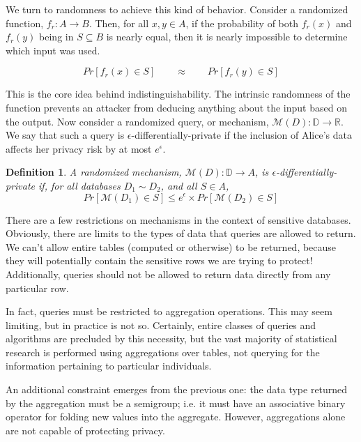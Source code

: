 \documentclass[12pt]{article}
\newtheorem{defn}{Definition}[section]
\begin{document}
We turn to randomness to achieve this kind of behavior.
Consider a randomized function, $f_r : A \rightarrow B$.
Then, for all $x,y \in A$, if the probability of both $f_r(x)$ and $f_r(y)$ being in $S \subseteq B$ is nearly equal, then it is nearly impossible to determine which input was used.

$$ Pr[f_r(x)\in S] \qquad\approx\qquad  Pr[f_r(y)\in S] $$

This is the core idea behind indistinguishability.
The intrinsic randomness of the function prevents an attacker from deducing anything about the input based on the output.
Now consider a randomized query, or mechanism, $\mathcal M(D) : \mathbb D \rightarrow \mathbb R$.
We say that such a query is $\epsilon$-differentially-private if the inclusion of Alice's data affects her privacy risk by at most $e^\epsilon$. %

\begin{defn}\label{def:diffpriv}
  A randomized mechanism, $\mathcal{M}(D) : \mathbb D \rightarrow A$, is $\epsilon$-differentially-private if, for all databases $D_1 \sim D_2$, and all $S \in A$,
  $$Pr[\mathcal M(D_1)\in S] \le e^\epsilon \times Pr[\mathcal M(D_2)\in S]$$
\end{defn}

There are a few restrictions on mechanisms in the context of sensitive databases.
Obviously, there are limits to the types of data that queries are allowed to return.
We can't allow entire tables (computed or otherwise) to be returned, because they will potentially contain the sensitive rows we are trying to protect!
Additionally, queries should not be allowed to return data directly from any particular row.

In fact, queries must be restricted to aggregation operations.
This may seem limiting, but in practice is not so.
Certainly, entire classes of queries and algorithms are precluded by this necessity, but the vast majority of statistical research is performed using aggregations over tables, not querying for the information pertaining to particular individuals.

An additional constraint emerges from the previous one: the data type returned by the aggregation must be a semigroup; i.e. it must have an associative binary operator for folding new values into the aggregate.
However, aggregations alone are not capable of protecting privacy.
\end{document}
